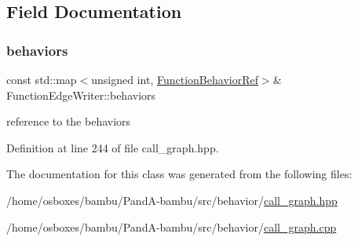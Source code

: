 \subsection{Field Documentation}
\mbox{\label{classFunctionEdgeWriter_ab994325dc215a5201871172807d41de9}} 
\subsubsection{\texorpdfstring{behaviors}{behaviors}}
{\footnotesize\ttfamily const std\+::map$<$unsigned int, \hyperlink{function__behavior_8hpp_affbc6a46ab86ddfabe31c10986d333dc}{Function\+Behavior\+Ref}$>$\& Function\+Edge\+Writer\+::behaviors\hspace{0.3cm}{\ttfamily [private]}}



reference to the behaviors 



Definition at line 244 of file call\+\_\+graph.\+hpp.



The documentation for this class was generated from the following files\+:\begin{DoxyCompactItemize}
\item 
/home/osboxes/bambu/\+Pand\+A-\/bambu/src/behavior/\hyperlink{call__graph_8hpp}{call\+\_\+graph.\+hpp}\item 
/home/osboxes/bambu/\+Pand\+A-\/bambu/src/behavior/\hyperlink{call__graph_8cpp}{call\+\_\+graph.\+cpp}\end{DoxyCompactItemize}
